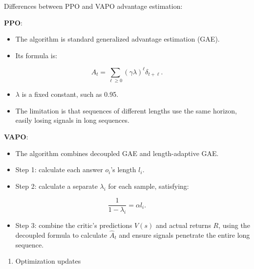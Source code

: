 Differences between PPO and VAPO advantage estimation:

\textbf{PPO}:

\begin{itemize}
\tightlist
\item
  The algorithm is standard generalized advantage estimation (GAE).
\item
{}
  Its formula is:
\end{itemize}

\[
A_t
=
\sum_{\ell\ge 0}(\gamma\lambda)^\ell\delta_{t+\ell}.
\]

\begin{itemize}
\tightlist
\item
  \(\lambda\) is a fixed constant, such as 0.95.
\item
  The limitation is that sequences of different lengths use the same horizon, easily losing signals in long sequences.
\end{itemize}

\textbf{VAPO}:

\begin{itemize}
\tightlist
\item
  The algorithm combines decoupled GAE and length-adaptive GAE.
\item
  Step 1: calculate each answer \(o_i\)'s length \(l_i\).
\item
{}
  Step 2: calculate a separate \(\lambda_i\) for each sample, satisfying:
\end{itemize}

\[
\frac{1}{1-\lambda_i}
=
\alpha l_i.
\]

\begin{itemize}
\tightlist
\item
  Step 3: combine the critic's predictions \(V(s)\) and actual returns \(R\), using the decoupled formula to calculate \(\hat{A}_t\) and ensure signals penetrate the entire long sequence.
\end{itemize}

\begin{enumerate}
\def\labelenumi{\arabic{enumi}.}
\setcounter{enumi}{3}
\tightlist
\item
  Optimization updates
\end{enumerate}

